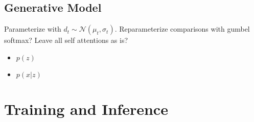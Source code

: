 \documentclass{article}
\begin{document}
\subsection{Generative Model}
Parameterize with $d_t\sim\mathcal{N}(\mu_t, \sigma_t)$.
Reparameterize comparisons with gumbel softmax?
Leave all self attentions as is?
\begin{itemize}
\item $p(z)$
\item $p(x|z)$
\end{itemize}

\section{Training and Inference}



\end{document}
